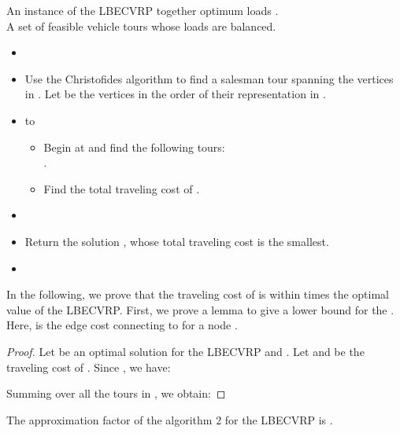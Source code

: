 \begin{algorithm}
\caption {} 
 An instance of the LBECVRP together optimum loads .\\
 A set of feasible vehicle tours whose loads are balanced.
\begin{itemize}
\item[] 
\item[] Use the Christofides algorithm \cite{Christofides} to find a salesman tour   spanning the vertices in .  Let  be the vertices in the order of their representation in . 
\item[]   to  
\begin{itemize}
\item[] Begin at  and find the following tours:\\
  . 
\item[] Find the total traveling cost of .
\end{itemize}
\item[] 
\item[]  Return the solution ,   whose total traveling cost is the smallest. 
\item[] 
\end{itemize}
\end{algorithm}
\indent In the following, we prove that the traveling cost of  is within  times the optimal value  of the LBECVRP. First, we prove a lemma to give a lower bound for the . Here,  is the edge cost connecting  to  for a node .
\begin{lemma}

\end{lemma}
\begin{proof}
\indent Let  be an optimal solution for the LBECVRP and . Let  and  be the traveling cost of . Since , we have:

\noindent Summing over all the tours in , we obtain:


\end{proof}
\begin{theorem}
The approximation factor of the algorithm 2 for the LBECVRP is .
\end{theorem}
